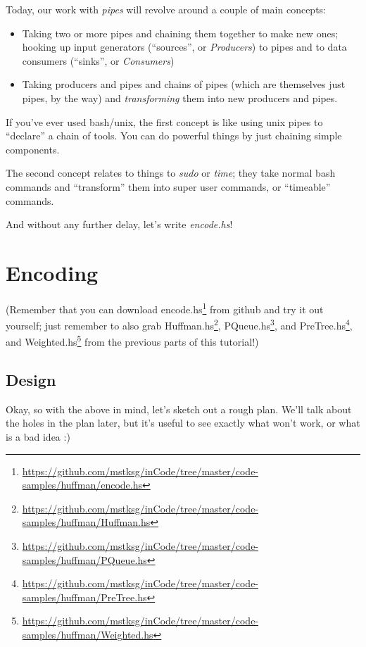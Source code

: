 \documentclass[]{article}
\renewcommand{\href}[2]{#2\footnote{\url{#1}}}
\begin{document}
Today, our work with \emph{pipes} will revolve around a couple of main concepts:

\begin{itemize}
\item
  Taking two or more pipes and chaining them together to make new ones; hooking
  up input generators (``sources'', or \emph{Producers}) to pipes and to data
  consumers (``sinks'', or \emph{Consumers})
\item
  Taking producers and pipes and chains of pipes (which are themselves just
  pipes, by the way) and \emph{transforming} them into new producers and pipes.
\end{itemize}

If you've ever used bash/unix, the first concept is like using unix pipes to
``declare'' a chain of tools. You can do powerful things by just chaining simple
components.

The second concept relates to things to \emph{sudo} or \emph{time}; they take
normal bash commands and ``transform'' them into super user commands, or
``timeable'' commands.

And without any further delay, let's write \emph{encode.hs}!

\section{Encoding}\label{encoding}

(Remember that you can download
\href{https://github.com/mstksg/inCode/tree/master/code-samples/huffman/encode.hs}{encode.hs}
from github and try it out yourself; just remember to also grab
\href{https://github.com/mstksg/inCode/tree/master/code-samples/huffman/Huffman.hs}{Huffman.hs},
\href{https://github.com/mstksg/inCode/tree/master/code-samples/huffman/PQueue.hs}{PQueue.hs},
and
\href{https://github.com/mstksg/inCode/tree/master/code-samples/huffman/PreTree.hs}{PreTree.hs},
and
\href{https://github.com/mstksg/inCode/tree/master/code-samples/huffman/Weighted.hs}{Weighted.hs}
from the previous parts of this tutorial!)

\subsection{Design}\label{design}

Okay, so with the above in mind, let's sketch out a rough plan. We'll talk about
the holes in the plan later, but it's useful to see exactly what won't work, or
what is a bad idea :)
\end{document}
